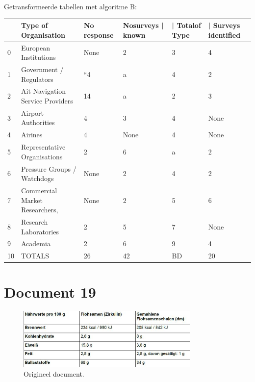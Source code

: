 Getransformeerde tabellen met algoritme B:

\begin{tabular}{llllll}
\toprule
{} &              Type of Organisation & No response & Nosurveys | known & | Totalof Type & | Surveys identified \\
\midrule
0  &             European Institutions &        None &                 2 &              3 &                    4 \\
1  &           Government / Regulators &          “4 &                 a &              4 &                    2 \\
2  &  Ait Navigation Service Providers &          14 &                 a &              2 &                    3 \\
3  &               Airport Authorities &           4 &                 3 &              4 &                 None \\
4  &                           Airines &           4 &              None &              4 &                 None \\
5  &      Representative Organisations &           2 &                 6 &              a &                    2 \\
6  &       Pressure Groups / Watchdogs &        None &                 2 &              4 &                    2 \\
7  &    Commercial Market Researchers, &        None &                 2 &              5 &                    6 \\
8  &             Research Laboratories &           2 &                 5 &              7 &                 None \\
9  &                          Academia &           2 &                 6 &              9 &                    4 \\
10 &                            TOTALS &          26 &                42 &             BD &                   20 \\
\bottomrule
\end{tabular}
\section{Document 19}

\begin{figure}[H]
    \centering
    \includegraphics[width=0.8\textwidth]{test-resultaten/19/original.png}
    \caption{Origineel document.}
\end{figure}

